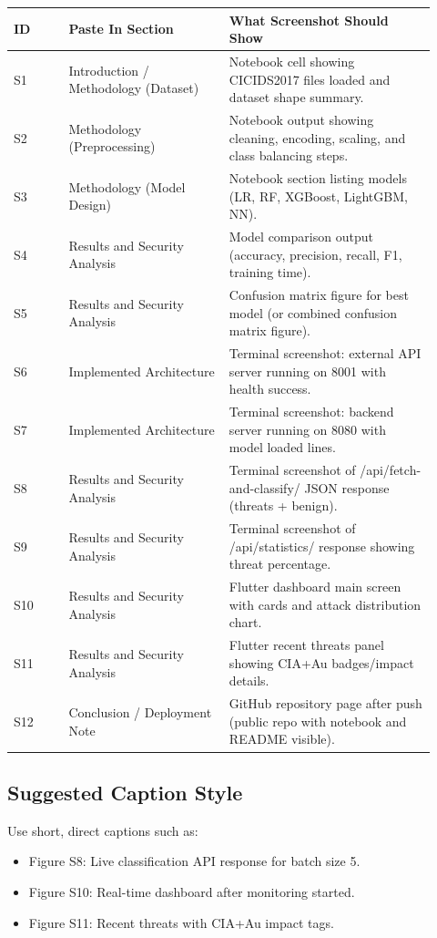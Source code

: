 \documentclass[12pt,a4paper]{article}
\begin{document}
\begin{longtable}{p{0.12\linewidth} p{0.35\linewidth} p{0.45\linewidth}}
\toprule
ID & Paste In Section & What Screenshot Should Show \\
\midrule
S1 & Introduction / Methodology (Dataset) & Notebook cell showing CICIDS2017 files loaded and dataset shape summary. \\
S2 & Methodology (Preprocessing) & Notebook output showing cleaning, encoding, scaling, and class balancing steps. \\
S3 & Methodology (Model Design) & Notebook section listing models (LR, RF, XGBoost, LightGBM, NN). \\
S4 & Results and Security Analysis & Model comparison output (accuracy, precision, recall, F1, training time). \\
S5 & Results and Security Analysis & Confusion matrix figure for best model (or combined confusion matrix figure). \\
S6 & Implemented Architecture & Terminal screenshot: external API server running on 8001 with health success. \\
S7 & Implemented Architecture & Terminal screenshot: backend server running on 8080 with model loaded lines. \\
S8 & Results and Security Analysis & Terminal screenshot of /api/fetch-and-classify/ JSON response (threats + benign). \\
S9 & Results and Security Analysis & Terminal screenshot of /api/statistics/ response showing threat percentage. \\
S10 & Results and Security Analysis & Flutter dashboard main screen with cards and attack distribution chart. \\
S11 & Results and Security Analysis & Flutter recent threats panel showing CIA+Au badges/impact details. \\
S12 & Conclusion / Deployment Note & GitHub repository page after push (public repo with notebook and README visible). \\
\bottomrule
\end{longtable}

\subsection*{Suggested Caption Style}
Use short, direct captions such as:
\begin{itemize}
\item Figure S8: Live classification API response for batch size 5.
\item Figure S10: Real-time dashboard after monitoring started.
\item Figure S11: Recent threats with CIA+Au impact tags.
\end{itemize}
\end{document}
